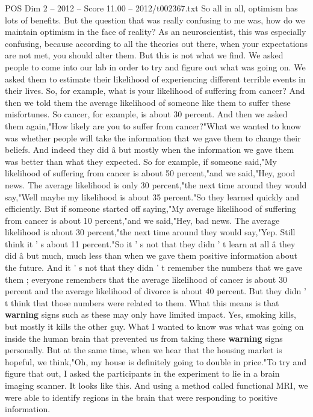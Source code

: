 \begin{textsample}{POS Dim 2 – 2012 – Score 11.00 – 2012/t002367.txt}
So all in all, optimism has lots of benefits.
But the question that was really confusing to me was, how do we maintain optimism in the face of reality?
As an neuroscientist, this was especially confusing, because according to all the theories out there, when your expectations are not met, you should alter them.
But this is not what we find.
We asked people to come into our lab in order to try and figure out what was going on.
We asked them to estimate their likelihood of experiencing different terrible events in their lives.
So, for example, what is your likelihood of suffering from cancer?
And then we told them the average likelihood of someone like them to suffer these misfortunes.
So cancer, for example, is about 30 percent.
And then we asked them again,"How likely are you to suffer from cancer?"What we wanted to know was whether people will take the information that we gave them to change their beliefs.
And indeed they did â but mostly when the information we gave them was better than what they expected.
So for example, if someone said,"My likelihood of suffering from cancer is about 50 percent,"and we said,"Hey, good news.
The average likelihood is only 30 percent,"the next time around they would say,"Well maybe my likelihood is about 35 percent."So they learned quickly and efficiently.
But if someone started off saying,"My average likelihood of suffering from cancer is about 10 percent,"and we said,"Hey, bad news.
The average likelihood is about 30 percent,"the next time around they would say,"Yep.
Still think it ' s about 11 percent."So it ' s not that they didn ' t learn at all â they did â but much, much less than when we gave them positive information about the future.
And it ' s not that they didn ' t remember the numbers that we gave them ; everyone remembers that the average likelihood of cancer is about 30 percent and the average likelihood of divorce is about 40 percent.
But they didn ' t think that those numbers were related to them.
What this means is that \textbf{warning} signs such as these may only have limited impact.
Yes, smoking kills, but mostly it kills the other guy.
What I wanted to know was what was going on inside the human brain that prevented us from taking these \textbf{warning} signs personally.
But at the same time, when we hear that the housing market is hopeful, we think,"Oh, my house is definitely going to double in price."To try and figure that out, I asked the participants in the experiment to lie in a brain imaging scanner.
It looks like this.
And using a method called functional MRI, we were able to identify regions in the brain that were responding to positive information.

\end{textsample}
